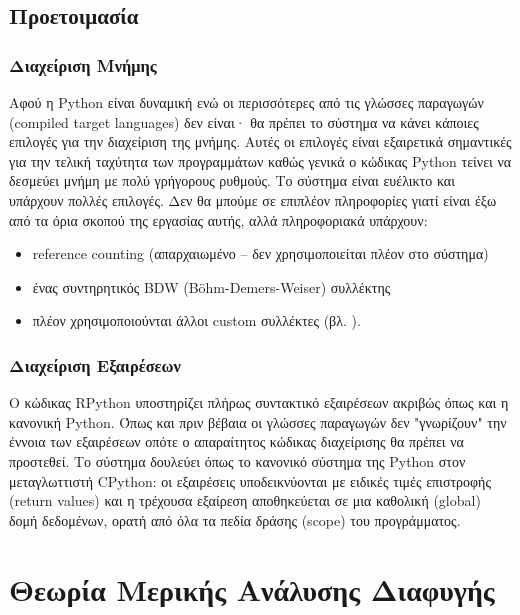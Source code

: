 
\subsection{Προετοιμασία}

\subsubsection{Διαχείριση Μνήμης}

Αφού η Python είναι δυναμική ενώ οι περισσότερες από τις γλώσσες παραγωγών
(compiled target languages) δεν είναι· θα πρέπει το σύστημα να κάνει κάποιες
επιλογές για την διαχείριση της μνήμης. Αυτές οι επιλογές είναι εξαιρετικά
σημαντικές για την τελική ταχύτητα των προγραμμάτων καθώς γενικά ο κώδικας
Python τείνει να δεσμεύει μνήμη με πολύ γρήγορους ρυθμούς. Το σύστημα είναι
ευέλικτο και υπάρχουν πολλές επιλογές. Δεν θα μπούμε σε επιπλέον πληροφορίες
γιατί είναι έξω από τα όρια σκοπού της εργασίας αυτής, αλλά πληροφοριακά
υπάρχουν:

\begin{itemize}
\item reference counting (απαρχαιωμένο – δεν χρησιμοποιείται πλέον στο σύστημα)
\item ένας συντηρητικός BDW (B\"ohm-Demers-Weiser) συλλέκτης\cite{bdw}
\item πλέον χρησιμοποιούνται άλλοι custom συλλέκτες (βλ. \cite{gc}).
\end{itemize}

\subsubsection{Διαχείριση Εξαιρέσεων}

Ο κώδικας RPython υποστηρίζει πλήρως συντακτικό εξαιρέσεων ακριβώς όπως και η
κανονική Python. Όπως και πριν βέβαια οι γλώσσες παραγωγών δεν "γνωρίζουν" την
έννοια των εξαιρέσεων οπότε ο απαραίτητος κώδικας διαχείρισης θα πρέπει να
προστεθεί. Το σύστημα δουλεύει όπως το κανονικό σύστημα της Python στον
μεταγλωττιστή CPython: οι εξαιρέσεις υποδεικνύονται με ειδικές τιμές επιστροφής
(return values) και η τρέχουσα εξαίρεση αποθηκεύεται σε μια καθολική (global)
δομή δεδομένων, ορατή από όλα τα πεδία δράσης (scope) του προγράμματος.


\section{Θεωρία Μερικής Ανάλυσης Διαφυγής}

